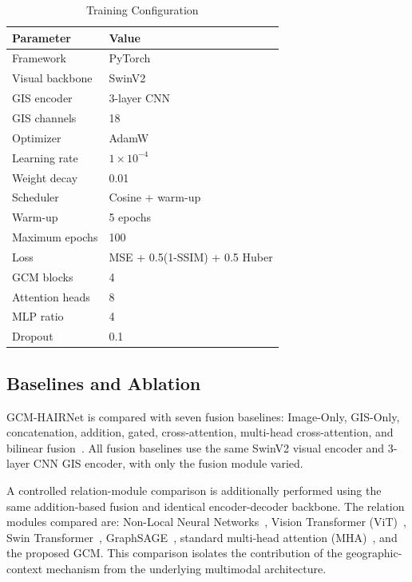 \documentclass[sigconf, review=true]{acmart}
\begin{document}
\begin{table}[t]
  \caption{Training Configuration}
  \label{tab:hyperparams}
  \begin{tabular}{ll}
    \toprule
    \textbf{Parameter} & \textbf{Value} \\
    \midrule
    Framework        & PyTorch~\cite{paszke2019pytorch} \\
    Visual backbone  & SwinV2 \\
    GIS encoder      & 3-layer CNN \\
    GIS channels     & 18 \\
    Optimizer        & AdamW~\cite{loshchilov2019adamw} \\
    Learning rate    & $1\times10^{-4}$ \\
    Weight decay     & 0.01 \\
    Scheduler        & Cosine + warm-up~\cite{loshchilov2017sgdr,kingma2015adam} \\
    Warm-up          & 5 epochs \\
    Maximum epochs   & 100 \\
    Loss             & MSE + 0.5(1-SSIM) + 0.5 Huber \\
    GCM blocks       & 4 \\
    Attention heads  & 8 \\
    MLP ratio        & 4 \\
    Dropout          & 0.1~\cite{srivastava2014dropout} \\
    \bottomrule
  \end{tabular}
\end{table}

\subsection{Baselines and Ablation}

GCM-HAIRNet is compared with seven fusion baselines: Image-Only, GIS-Only, concatenation, addition, gated, cross-attention, multi-head cross-attention, and bilinear fusion~\cite{lin2015bilinear}. All fusion baselines use the same SwinV2 visual encoder and 3-layer CNN GIS encoder, with only the fusion module varied.

A controlled relation-module comparison is additionally performed using the same addition-based fusion and identical encoder-decoder backbone. The relation modules compared are: Non-Local Neural Networks~\cite{wang2018nonlocal}, Vision Transformer (ViT)~\cite{dosovitskiy2021vit}, Swin Transformer~\cite{liu2021swin}, GraphSAGE~\cite{hamilton2017graphsage}, standard multi-head attention (MHA)~\cite{vaswani2017attention}, and the proposed GCM. This comparison isolates the contribution of the geographic-context mechanism from the underlying multimodal architecture.
\end{document}
